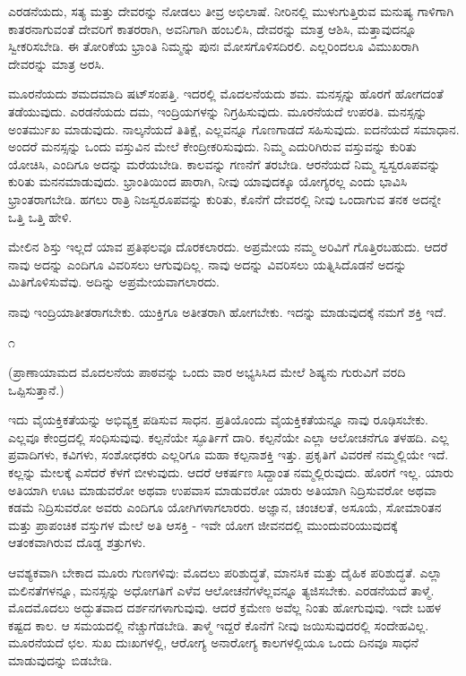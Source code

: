 ಎರಡನೆಯದು, ಸತ್ಯ ಮತ್ತು ದೇವರನ್ನು ನೋಡಲು ತೀವ್ರ ಅಭಿಲಾಷೆ. ನೀರಿನಲ್ಲಿ ಮುಳುಗುತ್ತಿರುವ ಮನುಷ್ಯ ಗಾಳಿಗಾಗಿ ಕಾತರನಾಗುವಂತೆ ದೇವರಿಗೆ ಕಾತರರಾಗಿ, ಅವನಿಗಾಗಿ ಹಂಬಲಿಸಿ, ದೇವರನ್ನು ಮಾತ್ರ ಆಶಿಸಿ, ಮತ್ತಾವುದನ್ನೂ ಸ್ವೀಕರಿಸಬೇಡಿ. ಈ ತೋರಿಕೆಯ ಭ್ರಾಂತಿ ನಿಮ್ಮನ್ನು ಪುನಃ ಮೋಸಗೊಳಿಸದಿರಲಿ. ಎಲ್ಲರಿಂದಲೂ ವಿಮುಖರಾಗಿ ದೇವರನ್ನು ಮಾತ್ರ ಅರಸಿ.

ಮೂರನೆಯದು ಶಮದಮಾದಿ ಷಟ್‌ಸಂಪತ್ತಿ. ಇದರಲ್ಲಿ ಮೊದಲನೆಯದು ಶಮ. ಮನಸ್ಸನ್ನು ಹೊರಗೆ ಹೋಗದಂತೆ ತಡೆಯುವುದು. ಎರಡನೆಯದು ದಮ, ಇಂದ್ರಿಯಗಳನ್ನು ನಿಗ್ರಹಿಸುವುದು. ಮೂರನೆಯದೆ ಉಪರತಿ. ಮನಸ್ಸನ್ನು ಅಂತರ್ಮುಖ ಮಾಡುವುದು. ನಾಲ್ಕನೆಯದೆ ತಿತಿಕ್ಷೆ, ಎಲ್ಲವನ್ನೂ ಗೊಣಗಾಡದೆ ಸಹಿಸುವುದು. ಐದನೆಯದೆ ಸಮಾಧಾನ. ಅಂದರೆ ಮನಸ್ಸನ್ನು ಒಂದು ವಸ್ತುವಿನ ಮೇಲೆ ಕೇಂದ್ರೀಕರಿಸುವುದು. ನಿಮ್ಮ ಎದುರಿಗಿರುವ ವಸ್ತುವನ್ನು ಕುರಿತು ಯೋಚಿಸಿ, ಎಂದಿಗೂ ಅದನ್ನು ಮರೆಯಬೇಡಿ. ಕಾಲವನ್ನು ಗಣನೆಗೆ ತರಬೇಡಿ. ಆರನೆಯದೆ ನಿಮ್ಮ ಸ್ವಸ್ವರೂಪವನ್ನು ಕುರಿತು ಮನನಮಾಡುವುದು. ಭ್ರಾಂತಿಯಿಂದ ಪಾರಾಗಿ, ನೀವು ಯಾವುದಕ್ಕೂ ಯೋಗ್ಯರಲ್ಲ ಎಂದು ಭಾವಿಸಿ ಭ್ರಾಂತರಾಗಬೇಡಿ. ಹಗಲು ರಾತ್ರಿ ನಿಜಸ್ವರೂಪವನ್ನು ಕುರಿತು, ಕೊನೆಗೆ ದೇವರಲ್ಲಿ ನೀವು ಒಂದಾಗುವ ತನಕ ಅದನ್ನೇ ಒತ್ತಿ ಒತ್ತಿ ಹೇಳಿ.

ಮೇಲಿನ ಶಿಸ್ತು ಇಲ್ಲದೆ ಯಾವ ಪ್ರತಿಫಲವೂ ದೊರಕಲಾರದು. ಅಪ್ರಮೇಯ ನಮ್ಮ ಅರಿವಿಗೆ ಗೊತ್ತಿರಬಹುದು. ಆದರೆ ನಾವು ಅದನ್ನು ಎಂದಿಗೂ ವಿವರಿಸಲು ಆಗುವುದಿಲ್ಲ. ನಾವು ಅದನ್ನು ವಿವರಿಸಲು ಯತ್ನಿಸಿದೊಡನೆ ಅದನ್ನು ಮಿತಿಗೊಳಿಸುವೆವು. ಅದಿನ್ನು ಅಪ್ರಮೇಯವಾಗಲಾರದು.

ನಾವು ಇಂದ್ರಿಯಾತೀತರಾಗಬೇಕು. ಯುಕ್ತಿಗೂ ಅತೀತರಾಗಿ ಹೋಗಬೇಕು. ಇದನ್ನು ಮಾಡುವುದಕ್ಕೆ ನಮಗೆ ಶಕ್ತಿ ಇದೆ.

\begin{center}
೧
\end{center}

(ಪ್ರಾಣಾಯಾಮದ ಮೊದಲನೆಯ ಪಾಠವನ್ನು ಒಂದು ವಾರ ಅಭ್ಯಸಿಸಿದ ಮೇಲೆ ಶಿಷ್ಯನು ಗುರುವಿಗೆ ವರದಿ ಒಪ್ಪಿಸುತ್ತಾನೆ.)

ಇದು ವೈಯಕ್ತಿಕತೆಯನ್ನು ಅಭಿವ್ಯಕ್ತ ಪಡಿಸುವ ಸಾಧನ. ಪ್ರತಿಯೊಂದು ವೈಯಕ್ತಿಕತೆಯನ್ನೂ ನಾವು ರೂಢಿಸಬೇಕು. ಎಲ್ಲವೂ ಕೇಂದ್ರದಲ್ಲಿ ಸಂಧಿಸುವುವು. ಕಲ್ಪನೆಯೇ ಸ್ಫೂರ್ತಿಗೆ ದಾರಿ. ಕಲ್ಪನೆಯೇ ಎಲ್ಲಾ ಆಲೋಚನೆಗೂ ತಳಹದಿ. ಎಲ್ಲ ಪ್ರವಾದಿಗಳು, ಕವಿಗಳು, ಸಂಶೋಧಕರು ಎಲ್ಲರಿಗೂ ಮಹಾ ಕಲ್ಪನಾಶಕ್ತಿ ಇತ್ತು. ಪ್ರಕೃತಿಗೆ ವಿವರಣೆ ನಮ್ಮಲ್ಲಿಯೇ ಇದೆ. ಕಲ್ಲನ್ನು ಮೇಲಕ್ಕೆ ಎಸೆದರೆ ಕೆಳಗೆ ಬೀಳುವುದು. ಆದರೆ ಆಕರ್ಷಣ ಸಿದ್ದಾಂತ ನಮ್ಮಲ್ಲಿರುವುದು. ಹೊರಗೆ ಇಲ್ಲ. ಯಾರು ಅತಿಯಾಗಿ ಊಟ ಮಾಡುವರೋ ಅಥವಾ ಉಪವಾಸ ಮಾಡುವರೋ ಯಾರು ಅತಿಯಾಗಿ ನಿದ್ರಿಸುವರೋ ಅಥವಾ ಕಡಮೆ ನಿದ್ರಿಸುವರೋ ಅವರು ಎಂದಿಗೂ ಯೋಗಿಗಳಾಗಲಾರರು. ಅಜ್ಞಾನ, ಚಂಚಲತೆ, ಅಸೂಯೆ, ಸೋಮಾರಿತನ ಮತ್ತು ಪ್ರಾಪಂಚಿಕ ವಸ್ತುಗಳ ಮೇಲೆ ಅತಿ ಆಸಕ್ತಿ - ಇವೇ ಯೋಗ ಜೀವನದಲ್ಲಿ ಮುಂದುವರಿಯುವುದಕ್ಕೆ ಆತಂಕವಾಗಿರುವ ದೊಡ್ಡ ಶತ್ರುಗಳು.

ಆವಶ್ಯಕವಾಗಿ ಬೇಕಾದ ಮೂರು ಗುಣಗಳಿವು: ಮೊದಲು ಪರಿಶುದ್ಧತೆ, ಮಾನಸಿಕ ಮತ್ತು ದೈಹಿಕ ಪರಿಶುದ್ಧತೆ. ಎಲ್ಲಾ ಮಲಿನತೆಗಳನ್ನೂ, ಮನಸ್ಸನ್ನು ಅಧೋಗತಿಗೆ ಎಳೆವ ಆಲೋಚನೆಗಳೆಲ್ಲವನ್ನೂ ತ್ಯಜಿಸಬೇಕು. ಎರಡನೆಯದೆ ತಾಳ್ಮೆ. ಮೊದಮೊದಲು ಅದ್ಭುತವಾದ ದರ್ಶನಗಳಾಗುವುವು. ಆದರೆ ಕ್ರಮೇಣ ಅವೆಲ್ಲ ನಿಂತು ಹೋಗುವುವು. ಇದೇ ಬಹಳ ಕಷ್ಟದ ಕಾಲ. ಆ ಸಮಯದಲ್ಲಿ ನೆಚ್ಚುಗೆಡಬೇಡಿ. ತಾಳ್ಮೆ ಇದ್ದರೆ ಕೊನೆಗೆ ನೀವು ಜಯಿಸುವುದರಲ್ಲಿ ಸಂದೇಹವಿಲ್ಲ. ಮೂರನೆಯದೆ ಛಲ. ಸುಖ ದುಃಖಗಳಲ್ಲಿ, ಆರೋಗ್ಯ ಅನಾರೋಗ್ಯ ಕಾಲಗಳಲ್ಲಿಯೂ ಒಂದು ದಿನವೂ ಸಾಧನೆ ಮಾಡುವುದನ್ನು ಬಿಡಬೇಡಿ.

